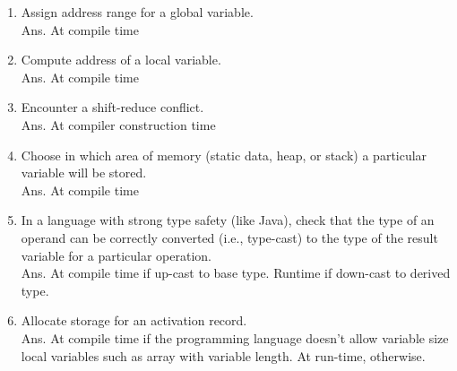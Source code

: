 \documentclass[11pt]{homework}
\begin{document}
\question
\begin{enumerate}[label=(\alph*)]
\item Assign address range for a global variable. \\
      Ans. At compile time 
\item Compute address of a local variable. \\
      Ans. At compile time
\item Encounter a shift-reduce conflict. \\
      Ans. At compiler construction time
\item Choose in which area of memory (static data, heap, or stack) a particular variable will be stored. \\
      Ans. At compile time
\item In a language with strong type safety (like Java), check that the type of an operand can be correctly converted (i.e., type-cast) to the type of the result variable for a particular operation. \\
      Ans. At compile time if up-cast to base type.
      Runtime if down-cast to derived type.
\item Allocate storage for an activation record. \\
      Ans. At compile time if the programming language doesn't allow variable size local variables such as array with variable length.
      At run-time, otherwise.

\end{enumerate}
\end{document}
